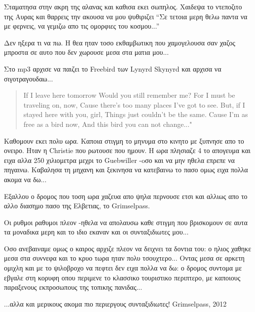 
Σταματησα στην ακρη της αλανας και καθισα εκει σωπηλος. Χαιδεψα το ντεποζιτο της Αυρας και θαρρεις την ακουσα να μου ψυθιριζει ``Σε τετοια μερη θελω παντα να με φερνεις, να γεμιζω απο τις ομορφιες του κοσμου...''


Δεν ηξερα τι να πω. Η θεα ηταν τοσο εκθαμβωτικη που χαμογελουσα σαν χαζος μπροστα σε αυτο που δεν χωρουσε μεσα στα ματια μου...


Στο mp3 αρχισε να παιζει το Freebird των Lynyrd Skynyrd και αρχισα να σιγοτραγουδαω...

\begin{verse}
If I leave here tomorrow
Would you still remember me?
For I must be traveling on, now,
Cause there's too many places I've got to see.
But, if I stayed here with you, girl,
Things just couldn't be the same.
Cause I'm as free as a bird now,
And this bird you can not change..."
\end{verse}


Καθομουν εκει πολυ ωρα. Καποια στιγμη το μηνυμα στο κινητο με ξυπνησε απο το ονειρο. Ηταν η Christie που ρωτουσε που ημουν. Η ωρα πλησιαζε 4 το απογευμα και ειχα αλλα 250 χιλιομετρα μεχρι το Guebwiller -oσο και να μην ηθελα επρεπε να πηγαινω.
Καβαλησα τη μηχανη και ξεκινησα να κατεβαινω το πασο ομως ειχα πολλα ακομα να δω...


Εξαλλου ο δρομος που τοση ωρα χαζευα απο ψηλα περνουσε ετσι και αλλιως απο το αλλο διασημο πασο της Ελβετιας, το Grimselpass.


Οι ρυθμοι ραθυμοι πλεον -ηθελα να απολαυσω καθε στιγμη που βρισκομουν σε αυτα τα μοναδικα μερη και το ιδιο εκαναν και οι συνταξιδιωτες μου...


Οσο ανεβαιναμε ομως ο καιρος αρχιζε πλεον να δειχνει τα δοντια του: ο ηλιος χαθηκε μεσα στα συννεφα και το κρυο τωρα ηταν πολυ τσουχτερο... 
Οντας μεσα σε αρκετη ομιχλη και με το ψιλοβροχο να πεφτει δεν ειχα πολλα να δω: ο δρομος συντομα με εβγαλε στη κορυφη οπου περιμενε το κλασσικο τουριστικο περιπτερο, με καποιους παραξενους εκπροσωπους της τοπικης πανιδας...


...αλλα και μερικους ακομα πιο περιεργους συνταξιδιωτες!
Grimselpass, 2012

